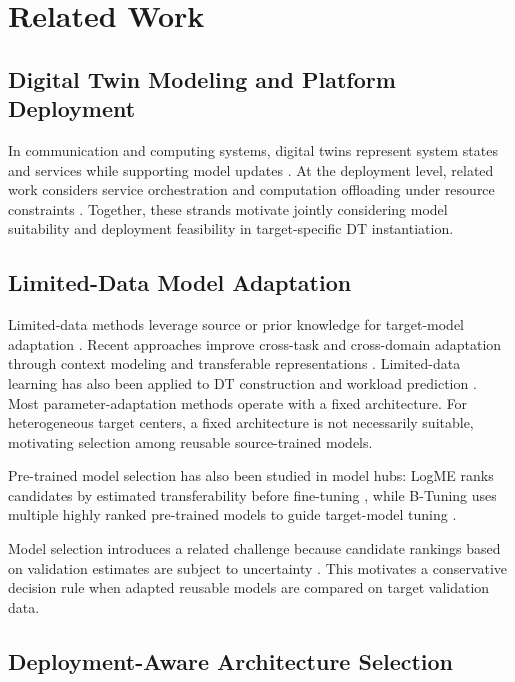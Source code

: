 \documentclass[a4paper,fleqn]{cas-sc}
\begin{document}
\section{Related Work}
\label{sec:related}

\subsection{Digital Twin Modeling and Platform Deployment}

In communication and computing systems, digital twins represent system states
and services while supporting model updates \cite{ref5,ref6,ref7,ref8}.
At the deployment level, related work considers service orchestration and
computation offloading under resource constraints \cite{ref27,ref28}.
Together, these strands motivate jointly considering model suitability and
deployment feasibility in target-specific DT instantiation.

\subsection{Limited-Data Model Adaptation}

Limited-data methods leverage source or prior knowledge for target-model
adaptation \cite{ref9,ref10,ref24}. Recent approaches improve cross-task and
cross-domain adaptation through context modeling and transferable
representations \cite{ref20,ref21,ref22,ref23}. Limited-data learning has also
been applied to DT construction and workload prediction \cite{ref11,ref25}.
Most parameter-adaptation methods operate with a fixed architecture. For
heterogeneous target centers, a fixed architecture is not necessarily suitable,
motivating selection among reusable source-trained models.

Pre-trained model selection has also been studied in model hubs: LogME ranks
candidates by estimated transferability before fine-tuning \cite{refLogME},
while B-Tuning uses multiple highly ranked pre-trained models to guide
target-model tuning \cite{refBTuning}.

Model selection introduces a related challenge because candidate rankings
based on validation estimates are subject to uncertainty
\cite{ref33,ref34}. This motivates a conservative decision rule when adapted
reusable models are compared on target validation data.

\subsection{Deployment-Aware Architecture Selection}
\end{document}
